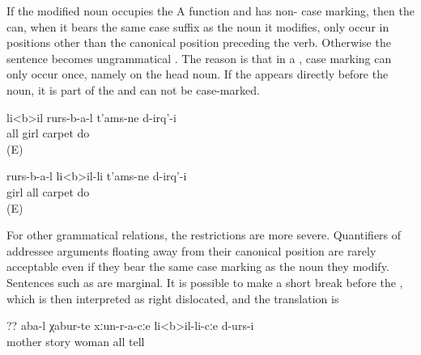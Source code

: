 If the modified noun occupies the A function and has non- case marking, then the  can, when it bears the same case suffix as the noun it modifies, only occur in positions other than the canonical position preceding the verb. Otherwise the sentence becomes ungrammatical . The reason is that in a , case marking can only occur once, namely on the head noun. If the  appears directly before the noun, it is part of the  and can not be case-marked.

%
\begin{exe}
	\ex	\label{ex:All girls used to make carpets@14}
	\begin{xlist}
		\ex	\label{ex:All girls used to make carpets@14a}
		\gll	li<b>il	rurs-b-a-l	t'ams-ne	d-irq'-i\\
			all	girl	carpet	do\\
		\glt	{} (E)
	
		\ex	\label{ex:All girls used to make carpets@14b}
		\gll	rurs-b-a-l	li<b>il-li	t'ams-ne	d-irq'-i\\
			girl	all	carpet	do\\
		\glt	{} (E)
		
\ex 	{}	\label{ex:All girls used to make carpets@14c}
		
	\end{xlist}
\end{exe}

For other grammatical relations, the restrictions are more severe. Quantifiers of addressee arguments floating away from their canonical position are rarely acceptable even if they bear the same case marking as the noun they modify. Sentences such as  are marginal. It is possible to make a short break before the , which is then interpreted as right dislocated, and the translation is 
%
\begin{exe}
	\ex	\label{ex:Mother told the stories to all women@15}
	\gll	?? 	aba-l	χabur-te	xːun-r-a-cːe	li<b>il-li-cːe	d-urs-i\\	
		{}	mother	story	woman	all	tell\\
	\glt	{}
\end{exe}

